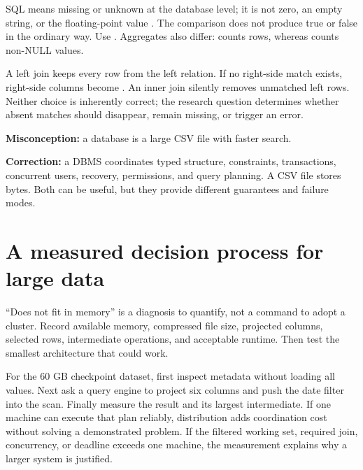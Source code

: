 SQL  means missing or unknown at the database level; it is not zero,
an empty string, or the floating-point value . The comparison
 does not produce true or false in the ordinary way. Use
. Aggregates also differ:  counts rows,
whereas  counts non-NULL values.

A left join keeps every row from the left relation. If no right-side match
exists, right-side columns become . An inner join silently removes
unmatched left rows. Neither choice is inherently correct; the research
question determines whether absent matches should disappear, remain missing,
or trigger an error.

\begin{misconceptionbox}
\textbf{Misconception:} a database is a large CSV file with faster search.

\textbf{Correction:} a DBMS coordinates typed structure, constraints,
transactions, concurrent users, recovery, permissions, and query planning. A
CSV file stores bytes. Both can be useful, but they provide different
guarantees and failure modes.
\end{misconceptionbox}

\section{A measured decision process for large data}

``Does not fit in memory'' is a diagnosis to quantify, not a command to adopt a
cluster. Record available memory, compressed file size, projected columns,
selected rows, intermediate operations, and acceptable runtime. Then test the
smallest architecture that could work.

For the 60 GB checkpoint dataset, first inspect metadata without loading all
values. Next ask a query engine to project six columns and push the date filter
into the scan. Finally measure the result and its largest intermediate. If one
machine can execute that plan reliably, distribution adds coordination cost
without solving a demonstrated problem. If the filtered working set, required
join, concurrency, or deadline exceeds one machine, the measurement explains
why a larger system is justified.


